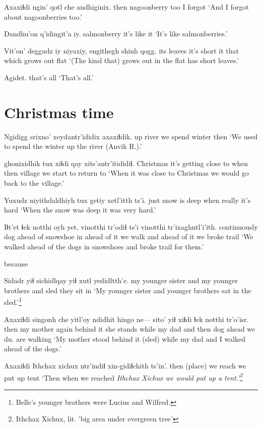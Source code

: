 \documentclass[12pt]{article}
\begin{document}
\gll Axaxiɬdi {ngin' qotl} che andhiginix.
then     nagoonberry too {I forgot}
\glt `And I forgot about nagoonberries too.'
\glend

\gll Dandhu'on q'idingit'a iy. 
salmonberry {it's like} it 
\glt `It's like salmonberries.'  
\glend

\gll Vit'on' deggudz iy niyaxiy,                   engithegh {shinh qogg.}
{its leaves} {it's short} it {that which grows} out flat
\glt `(The kind that) grows out in the flat has short leaves.'
\glend

\gll Agidet.
{{that's all}}
\glt `That's all.'
\glend

\section{Christmas time}

\gll Ngidigg srixno' xeydantr'ididix axaxiɬdik.
up      river   {we spend winter} then
\glt `We used to spend the winter up the river (Anvik R.).'
\glend

 ghonixidhik tux xiɬdi  qay xits'antr'itididiɬ.
Christmas {it's getting close to} when then village {we start to return to}
\glt `When it was close to Christmas we would go back to the village.'
\glend

\gll Yuxudz niyithdaldhiyh tux getiy xetl'itth ts'i.
just     {snow is deep} when really {it's hard} 
\glt `When the snow was deep it was very hard.'
\glend

\gll Iɬt'et ɬek notthi oyh yet, vinotthi tr'odiɬ      ts'i vinotthi tr'ixaghntl'i'ith.
continuously dog {ahead of} snowshoe in {ahead of it} {we walk} and {ahead of it} {we broke trail}
\glt `We walked ahead of the dogs in snowshoes and broke trail for them.'
\glend

because
 
\gll Sidadr yiɬ sichidlqay yiɬ xutl yedidltth'e.
{my younger sister} and {my younger brothers} and sled {they sit in}
\glt `My younger sister and younger brothers sat in the sled.'\footnote{Belle's younger brothers were Lucius and Wilfred.}
\glend

\gll Axaxiɬdi singonh che yitl'oy ndidhit hingo ne--- sito' yiɬ xiɬdi ɬek notthi tr'o'isr.
then {my mother} again {behind it} {she stands} while {} {my dad} and then dog ahead {we du. are walking}
\glt `My mother stood behind it (sled) while my dad and I walked ahead of the dogs.'
\glend

\gll Axaxiɬdi {Ithchax xichux} ntr'indiɬ xin-gidiɬchith ts'in'.
then  {(place)} {we reach} {we put up tent} 
\glt `Then when we reached \em Ithchax Xichux \em we would put up a tent.'\footnote{Ithchax Xichux, lit. 'big area under evergreen tree'}
\glend
\end{document}
